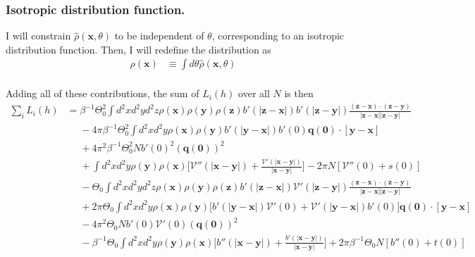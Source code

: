 \documentclass{article}
\begin{document}
\subsubsection{Isotropic distribution function.}

I will constrain $\hat{\rho}(\bm{x},\theta)$ to be independent of $\theta$, corresponding to
an isotropic distribution function. Then, I will redefine the distribution as
\begin{align}
  \rho(\bm{x})&\equiv\int d\theta\hat{\rho}(\bm{x},\theta)\nonumber\\
\end{align}

Adding all of these contributions, the sum of $L_i(h)$ over all $N$ is then
\begin{align}
  \sum_i L_i(h)
  &=\beta^{-1}\Theta_0^2\int d^2xd^2yd^2z\rho(\bm{x})\rho(\bm{y})
    \rho(\bm{z})b'(|\bm{z}-\bm{x}|)b'(|\bm{z}-\bm{y}|)
    \frac{(\bm{z}-\bm{x})\cdot(\bm{z}-\bm{y})}{|\bm{z}-\bm{x}||\bm{z}-\bm{y}|}\nonumber\\
  &\phantom{=}-4\pi\beta^{-1}\Theta_0^2\int d^2xd^2y\rho(\bm{x})\rho(\bm{y})
    b'(|\bm{y}-\bm{x}|)b'(0)\bm{q}(\bm{0})\cdot[\bm{y}-\bm{x}]\nonumber\\
  &\phantom{=}+4\pi^2\beta^{-1}\Theta_0^2Nb'(0)^2(\bm{q}(\bm{0}))^2\nonumber\\
  &\phantom{=}+\int d^2xd^2y\rho(\bm{y})\rho(\bm{x})
    \bigg[\mathcal{V}''(|\bm{x}-\bm{y}|)
    +\frac{\mathcal{V}'(|\bm{x}-\bm{y}|)}{|\bm{x}-\bm{y}|}\bigg]
    -2\pi N[\mathcal{V}''(0)+s(0)]\nonumber\\
  &\phantom{=}
    -\Theta_0\int d^2xd^2yd^2z\rho(\bm{x})\rho(\bm{y})
    \rho(\bm{z})b'(|\bm{z}-\bm{x}|)\mathcal{V}'(|\bm{z}-\bm{y}|)
    \frac{(\bm{z}-\bm{x})\cdot(\bm{z}-\bm{y})}{|\bm{z}-\bm{x}||\bm{z}-\bm{y}|}\nonumber\\
  &\phantom{=}+2\pi\Theta_0\int d^2xd^2y\rho(\bm{x})\rho(\bm{y})
    \bigg[b'(|\bm{y}-\bm{x}|)\mathcal{V}'(0)+\mathcal{V}'(|\bm{y}-\bm{x}|)b'(0)\bigg]
    \bm{q}(\bm{0})\cdot[\bm{y}-\bm{x}]\nonumber\\
  &\phantom{=}-4\pi^2\Theta_0Nb'(0)\mathcal{V}'(0)(\bm{q}(\bm{0}))^2\nonumber\\
  &\phantom{=}-\beta^{-1}\Theta_0\int d^2xd^2y\rho(\bm{y})\rho(\bm{x})
    \bigg[b''(|\bm{x}-\bm{y}|)
    +\frac{b'(|\bm{x}-\bm{y}|)}{|\bm{x}-\bm{y}|}\bigg]
    +2\pi\beta^{-1}\Theta_0 N[b''(0)+t(0)]
\end{align}
\end{document}
